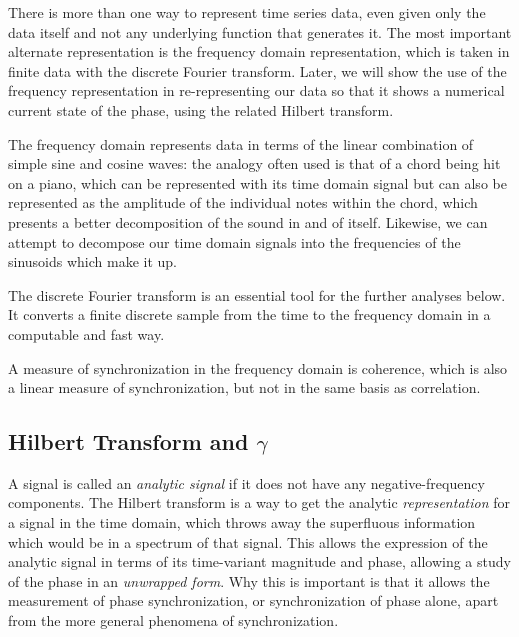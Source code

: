 \documentclass[12pt]{article}
\begin{document}
There is more than one way to represent time series data, even given only the data itself and not any underlying function that generates it. The most important alternate representation is the frequency domain representation, which is taken in finite data with the discrete Fourier transform. Later, we will show the use of the frequency representation in re-representing our data so that it shows a numerical current state of the phase, using the related Hilbert transform.

The frequency domain represents data in terms of the linear combination of simple sine and cosine waves: the analogy often used is that of a chord being hit on a piano, which can be represented with its time domain signal but can also be represented as the amplitude of the individual notes within the chord, which presents a better decomposition of the sound in and of itself. Likewise, we can attempt to decompose our time domain signals into the frequencies of the sinusoids which make it up.

The discrete Fourier transform is an essential tool for the further analyses below. It converts a finite discrete sample from the time to the frequency domain in a computable and fast way.

A measure of synchronization in the frequency domain is coherence, which is also a linear measure of synchronization, but not in the same basis as correlation. %


\subsection{Hilbert Transform and $\gamma$}

A signal is called an \emph{analytic signal} if it does not have any negative-frequency components. The Hilbert transform is a way to get the analytic \emph{representation} for a signal in the time domain, which throws away the superfluous information which would be in a spectrum of that signal. This allows the expression of the analytic signal in terms of its time-variant magnitude and phase, allowing a study of the phase in an \emph{unwrapped form}\cite{gabor}. Why this is important is that it allows the measurement of phase synchronization, or synchronization of phase alone, apart from the more general phenomena of synchronization.
\end{document}

